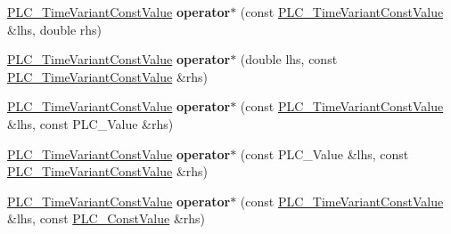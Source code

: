 \begin{DoxyCompactItemize}
\item 
\hypertarget{classns3_1_1PLC__TimeVariantConstValue_ab448baf9ff1287c554efd62db5a06b4c}{\hyperlink{classns3_1_1PLC__TimeVariantConstValue}{\-P\-L\-C\-\_\-\-Time\-Variant\-Const\-Value} {\bfseries operator$\ast$} (const \hyperlink{classns3_1_1PLC__TimeVariantConstValue}{\-P\-L\-C\-\_\-\-Time\-Variant\-Const\-Value} \&lhs, double rhs)}\label{classns3_1_1PLC__TimeVariantConstValue_ab448baf9ff1287c554efd62db5a06b4c}

\item 
\hypertarget{classns3_1_1PLC__TimeVariantConstValue_a1c73efd3863dba75d00f1ee4e323f8b1}{\hyperlink{classns3_1_1PLC__TimeVariantConstValue}{\-P\-L\-C\-\_\-\-Time\-Variant\-Const\-Value} {\bfseries operator$\ast$} (double lhs, const \hyperlink{classns3_1_1PLC__TimeVariantConstValue}{\-P\-L\-C\-\_\-\-Time\-Variant\-Const\-Value} \&rhs)}\label{classns3_1_1PLC__TimeVariantConstValue_a1c73efd3863dba75d00f1ee4e323f8b1}

\item 
\hypertarget{classns3_1_1PLC__TimeVariantConstValue_ad86144b4affd1348d6c7e39721955384}{\hyperlink{classns3_1_1PLC__TimeVariantConstValue}{\-P\-L\-C\-\_\-\-Time\-Variant\-Const\-Value} {\bfseries operator$\ast$} (const \hyperlink{classns3_1_1PLC__TimeVariantConstValue}{\-P\-L\-C\-\_\-\-Time\-Variant\-Const\-Value} \&lhs, const \-P\-L\-C\-\_\-\-Value \&rhs)}\label{classns3_1_1PLC__TimeVariantConstValue_ad86144b4affd1348d6c7e39721955384}

\item 
\hypertarget{classns3_1_1PLC__TimeVariantConstValue_a79789c82ab0873a08f4b9964c661fc18}{\hyperlink{classns3_1_1PLC__TimeVariantConstValue}{\-P\-L\-C\-\_\-\-Time\-Variant\-Const\-Value} {\bfseries operator$\ast$} (const \-P\-L\-C\-\_\-\-Value \&lhs, const \hyperlink{classns3_1_1PLC__TimeVariantConstValue}{\-P\-L\-C\-\_\-\-Time\-Variant\-Const\-Value} \&rhs)}\label{classns3_1_1PLC__TimeVariantConstValue_a79789c82ab0873a08f4b9964c661fc18}

\item 
\hypertarget{classns3_1_1PLC__TimeVariantConstValue_ab76520fe3f17dc41a0bfc4494bac8ed0}{\hyperlink{classns3_1_1PLC__TimeVariantConstValue}{\-P\-L\-C\-\_\-\-Time\-Variant\-Const\-Value} {\bfseries operator$\ast$} (const \hyperlink{classns3_1_1PLC__TimeVariantConstValue}{\-P\-L\-C\-\_\-\-Time\-Variant\-Const\-Value} \&lhs, const \hyperlink{classns3_1_1PLC__ConstValue}{\-P\-L\-C\-\_\-\-Const\-Value} \&rhs)}\label{classns3_1_1PLC__TimeVariantConstValue_ab76520fe3f17dc41a0bfc4494bac8ed0}


\end{DoxyCompactItemize}
